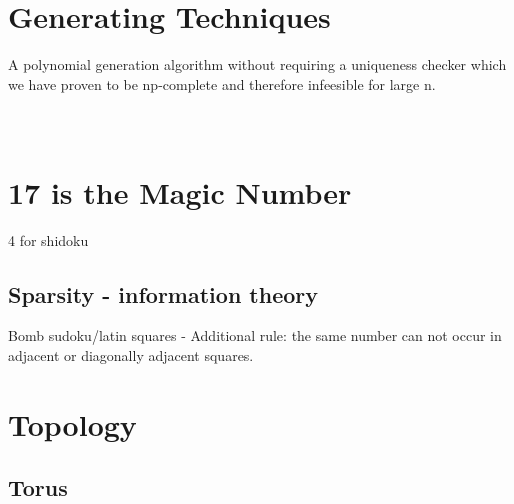 \documentclass[a4paper,12pt]{article}
\begin{document}
\section{Generating  Techniques}
	A polynomial generation algorithm without requiring a uniqueness checker which we have proven to be np-complete and therefore infeesible for large n.
~~~~~~~~~~~~~~~~~~~~~~~~~~~~~~~~~~~~~~~~~~~~~~~~~~~~~~~~~~~~~~~~~~~~~~~~~~~~~~ %
\section{17 is the Magic Number}
	4 for shidoku
	\subsection{Sparsity - information theory}
		Bomb sudoku/latin squares - Additional rule: the same number can not occur in adjacent or diagonally adjacent squares.

\section{Topology}
	\subsection{Torus}
\end{document}
